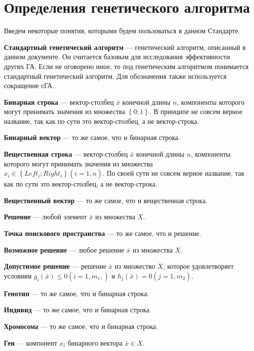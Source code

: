 \chapter{Определения генетического алгоритма}\label{StandardGA:section_def}

Введем некоторые понятия, которыми будем пользоваться в данном Стандарте.

\textbf{Стандартный генетический алгоритм} --- генетический алгоритм, описанный в данном документе. Он считается базовым для исследования эффективности других ГА. Если не оговорено иное, то под генетическим алгоритмом понимается стандартный генетический алгоритм. Для обозначения также используется сокращение сГА.

\textbf{Бинарная строка} --- вектор-столбец $\bar{x}$ конечной длины $ n $, компоненты которого могут принимать значения из множества $ \left\lbrace 0; 1\right\rbrace  $. В принципе не совсем верное название, так как по сути это вектор-столбец, а не вектор-строка.

\textbf{Бинарный вектор} --- то же самое, что и бинарная строка.

\textbf{Вещественная строка} --- вектор-столбец $\bar{x}$ конечной длины $ n $, компоненты которого могут принимать значения из множества $ x_i\in\left\lbrace Left_i;Right_i\right\rbrace (i=\overline{1,n}) $. По своей сути не совсем верное название, так как по сути это вектор-столбец, а не вектор-строка.

\textbf{Вещественный вектор} --- то же самое, что и вещественная строка.

\textbf{Решение} --- любой элемент $\bar{x}$ из множества $ X $.

\textbf{Точка поискового пространства} --- то же самое, что и решение.

\textbf{Возможное решение} --- любое решение $\bar{x}$ из множества $ X $.

\textbf{Допустимое решение} --- решение $\bar{x}$ из множество $ X $, которое удовлетворяет условиям $ g_i\left (\bar{x}\right )\leq 0 \left( i=\overline{1,m_1},\nonumber\right)  $ и $ h_j\left (\bar{x}\right )= 0 \left(  j=\overline{1,m_2}\right)  $.

\textbf{Генотип} --- то же самое, что и бинарная строка.

\textbf{Индивид} --- то же самое, что и бинарная строка. 

\textbf{Хромосома} --- то же самое, что и бинарная строка.

\textbf{Ген} --- компонент $ x_i $ бинарного вектора $\bar{x}\in X$.

